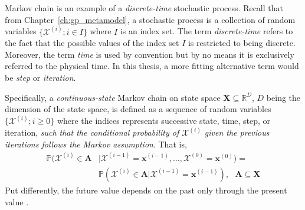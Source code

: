 Markov chain is an example of a \emph{discrete-time} stochastic process.
Recall that from Chapter~\ref{ch:gp_metamodel}, a stochastic process is a collection of random variables $\{\mathcal{X}^{(i)}; i \in I\}$ where $I$ is an index set.
The term \emph{discrete-time} refers to the fact that the possible values of the index set $I$ is restricted to being discrete.
Moreover, the term \emph{time} is used by convention but by no means it is exclusively referred to the physical time.
In this thesis, a more fitting alternative term would be \emph{step} or \emph{iteration}.

Specifically, a \emph{continuous-state} Markov chain on state space $\mathbf{X} \subseteq \mathbb{R}^D$, $D$ being the dimension of the state space, is defined as a sequence of random variables $\{\bm{\mathcal{X}}^{(i)}; i \geq 0\}$ where the indices represents successive state, time, step, or iteration,
\emph{such that the conditional probability of $\bm{\mathcal{X}}^{(i)}$ given the previous iterations follows the Markov assumption}.
That is,
\begin{equation}
  \begin{split}
  \mathbb{P}(\bm{\mathcal{X}}^{(i)} \in \mathbf{A} & | \bm{\mathcal{X}}^{(i-1)} = \bm{x}^{(i-1)}, \ldots, \bm{\mathcal{X}}^{(0)} = \bm{x}^{(0)}) = \\
  & \mathbb{P}(\bm{\mathcal{X}}^{(i)} \in \mathbf{A} | \bm{\mathcal{X}}^{(i-1)} = \bm{x}^{(i-1)}), \,\,\,\, \mathbf{A} \subseteq \mathbf{X}
  \end{split}
\label{eq:markov_property}
\end{equation}
Put differently, the future value depends on the past only through the present value \cite{Geyer2011,Sokal1997}.

